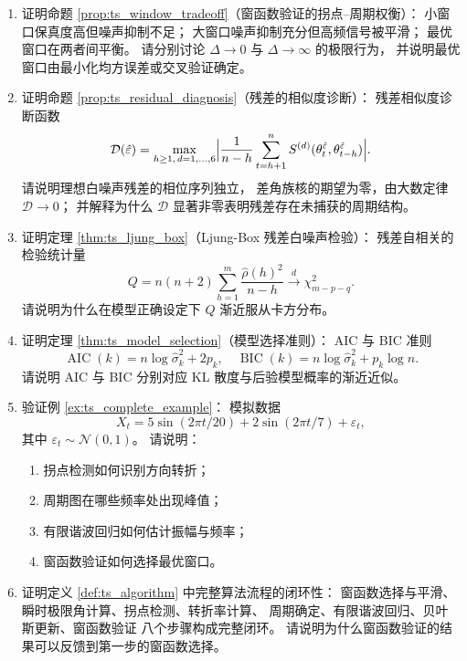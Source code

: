 \begin{enumerate}[leftmargin=3em, label=\textbf{题 \arabic*}]
    \item 证明命题 \ref{prop:ts_window_tradeoff}（窗函数验证的拐点--周期权衡）：
    小窗口保真度高但噪声抑制不足；
    大窗口噪声抑制充分但高频信号被平滑；
    最优窗口在两者间平衡。
    请分别讨论 $\Delta\to0$ 与 $\Delta\to\infty$ 的极限行为，
    并说明最优窗口由最小化均方误差或交叉验证确定。

    \item 证明命题 \ref{prop:ts_residual_diagnosis}（残差的相似度诊断）：
    残差相似度诊断函数
    \[
    \mathcal{D}(\hat{\varepsilon})=\max_{h\ge1,\,d=1,\dots,6}
    \Bigl|\frac{1}{n-h}\sum_{t=h+1}^n
    S^{(d)}(\theta_t^{\hat{\varepsilon}},
    \theta_{t-h}^{\hat{\varepsilon}})\Bigr|.
    \]
    请说明理想白噪声残差的相位序列独立，
    差角族核的期望为零，由大数定律 $\mathcal{D}\to0$；
    并解释为什么 $\mathcal{D}$ 显著非零表明残差存在未捕获的周期结构。

    \item 证明定理 \ref{thm:ts_ljung_box}（Ljung-Box 残差白噪声检验）：
    残差自相关的检验统计量
    \[
    Q=n(n+2)\sum_{h=1}^m\frac{\hat\rho(h)^2}{n-h}
    \xrightarrow{d}\chi^2_{m-p-q}.
    \]
    请说明为什么在模型正确设定下 $Q$ 渐近服从卡方分布。

    \item 证明定理 \ref{thm:ts_model_selection}（模型选择准则）：
    AIC 与 BIC 准则
    \[
    \operatorname{AIC}(k)=n\log\hat\sigma_k^2+2p_k,
    \quad
    \operatorname{BIC}(k)=n\log\hat\sigma_k^2+p_k\log n.
    \]
    请说明 AIC 与 BIC 分别对应 KL 散度与后验模型概率的渐近近似。

    \item 验证例 \ref{ex:ts_complete_example}：
    模拟数据
    \[
    X_t=5\sin(2\pi t/20)+2\sin(2\pi t/7)+\varepsilon_t,
    \]
    其中 $\varepsilon_t\sim\mathcal{N}(0,1)$。
    请说明：
    \begin{enumerate}[label=(\roman*)]
        \item 拐点检测如何识别方向转折；
        \item 周期图在哪些频率处出现峰值；
        \item 有限谐波回归如何估计振幅与频率；
        \item 窗函数验证如何选择最优窗口。
    \end{enumerate}

    \item 证明定义 \ref{def:ts_algorithm} 中完整算法流程的闭环性：
    窗函数选择与平滑、瞬时极限角计算、拐点检测、转折率计算、
    周期确定、有限谐波回归、贝叶斯更新、窗函数验证
    八个步骤构成完整闭环。
    请说明为什么窗函数验证的结果可以反馈到第一步的窗函数选择。


\end{enumerate}
